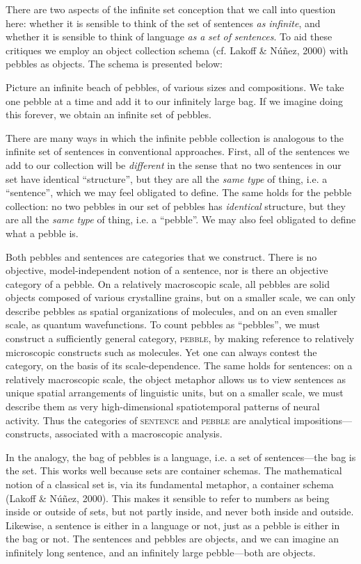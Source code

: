   There are two aspects of the infinite set conception that we call into question here:  whether it is sensible to think of the set of sentences \textit{as} \textit{infinite}, and  whether it is sensible to think of language \textit{as} \textit{a} \textit{set} \textit{of} \textit{sentences}. To aid these critiques we employ an object collection schema (cf. Lakoff \& Núñez, 2000) with pebbles as objects. The schema is presented below: 

Picture an infinite beach of pebbles, of various sizes and compositions. We take one pebble at a time and add it to our infinitely large bag. If we imagine doing this forever, we obtain an infinite set of pebbles. 

  There are many ways in which the infinite pebble collection is analogous to the infinite set of sentences in conventional approaches. First, all of the sentences we add to our collection will be \textit{different} in the sense that no two sentences in our set have identical “structure”, but they are all the \textit{same} \textit{type} of thing, i.e. a “sentence”, which we may feel obligated to define. The same holds for the pebble collection: no two pebbles in our set of pebbles has \textit{identical} structure, but they are all the \textit{same} \textit{type} of thing, i.e. a “pebble”. We may also feel obligated to define what a pebble is.

  Both pebbles and sentences are categories that we construct. There is no objective, model-independent notion of a sentence, nor is there an objective category of a pebble. On a relatively macroscopic scale, all pebbles are solid objects composed of various crystalline grains, but on a smaller scale, we can only describe pebbles as spatial organizations of molecules, and on an even smaller scale, as quantum wavefunctions. To count pebbles as “pebbles”, we must construct a sufficiently general category, \textsc{pebble}, by making reference to relatively microscopic constructs such as molecules. Yet one can always contest the category, on the basis of its scale-dependence. The same holds for sentences: on a relatively macroscopic scale, the object metaphor allows us to view sentences as unique spatial arrangements of linguistic units, but on a smaller scale, we must describe them as very high-dimensional spatiotemporal patterns of neural activity. Thus the categories of \textsc{sentence} and \textsc{pebble} are analytical impositions—constructs, associated with a macroscopic analysis. 

  In the analogy, the bag of pebbles is a language, i.e. a set of sentences—the bag is the set. This works well because sets are container schemas. The mathematical notion of a classical set is, via its fundamental metaphor, a container schema (Lakoff \& Núñez, 2000). This makes it sensible to refer to numbers as being inside or outside of sets, but not partly inside, and never both inside and outside. Likewise, a sentence is either in a language or not, just as a pebble is either in the bag or not. The sentences and pebbles are objects, and we can imagine an infinitely long sentence, and an infinitely large pebble—both are objects. 

